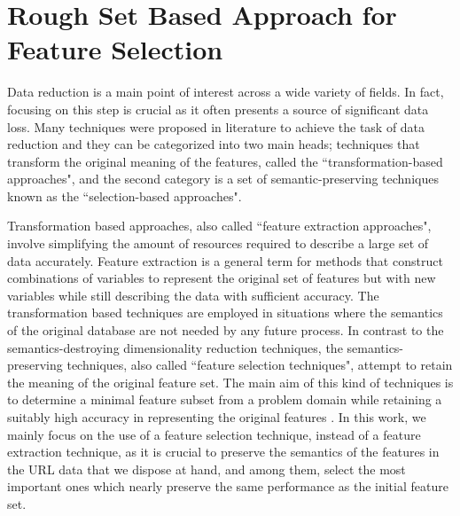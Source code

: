 \documentclass{llncs}
\begin{document}
%
\section{Rough Set Based Approach for Feature Selection}
\label{sec:featureselection}

Data reduction is a main point of interest across a wide variety of fields. In fact, focusing on this step is crucial as it often presents a source of significant data loss. Many techniques were proposed in literature to achieve the task of data reduction and they can be categorized into two main heads; techniques that transform the original meaning of the features, called the ``transformation-based approaches", and the second category is a set of semantic-preserving techniques known as the ``selection-based approaches".

Transformation based approaches, also called ``feature extraction approaches", involve simplifying the amount of resources required to describe a large set of data accurately. Feature extraction is a general term for methods that construct combinations of variables to represent the original set of features but with new variables while still describing the data with sufficient accuracy. The transformation based techniques are employed in situations where the semantics of the original database are not needed by any future process. In contrast to the semantics-destroying dimensionality reduction techniques, the semantics-preserving techniques, also called ``feature selection techniques", attempt to retain the meaning of the original feature set. The main aim of this kind of techniques is to determine a minimal feature subset from a problem domain while retaining a suitably high accuracy in representing the original features \cite{liu1998feature}. In this work, we mainly focus on the use of a feature selection technique, instead of a feature extraction technique, as it is crucial to preserve the semantics of the features in the URL data that we dispose at hand, and among them, select the most important ones which nearly preserve  the same performance as the initial feature set.
\end{document}

